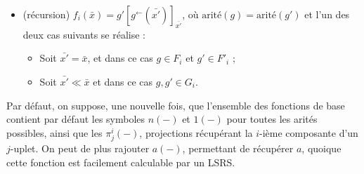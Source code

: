 \documentclass{report}
\newcommand{\eqpred}[3]{#1\left[ #2^{\leftarrow}(#3) \right]_{#3}}
\begin{document}
\begin{definition}[$a$-LSRS]
\begin{itemize}[itemsep=-1mm]
				\item 	(récursion)		$f_i\left(\bar{x}\right) = \eqpred{g'}{g}{\bar{x'}}$, où $\text{arité}(g) = \text{arité}(g')$ et l'un des deux cas suivants se réalise :
						\begin{itemize}[itemsep=-1mm]
							\item 	Soit $\bar{x'} = \bar{x}$, et dans ce cas $g \in F_i$ et $g' \in F'_i$ ;
							\item 	Soit $\bar{x'} \ll \bar{x}$ et dans ce cas $g, g' \in G_i$. 
						\end{itemize}
%						
%						
			\end{itemize}
			
		\end{definition}
		
		\begin{remark}
			\label{rk:fonctions_de_base_LSRS}
			Par défaut, on suppose, une nouvelle fois, que l'ensemble des fonctions de base contient par défaut les symboles $n(-)$ et $1(-)$ pour toutes les arités possibles, ainsi que les $\pi^i_j(-)$, projections récupérant la $i$-ième composante d'un $j$-uplet. On peut de plus rajouter $a(-)$, permettant de récupérer $a$, quoique cette fonction est facilement calculable par un LSRS.
		\end{remark}
		
\end{document}
